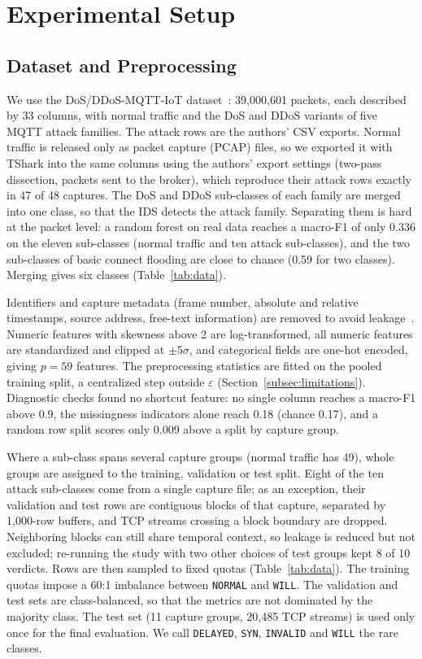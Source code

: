 \section{Experimental Setup}\label{sec:setup}

\subsection{Dataset and Preprocessing}\label{subsec:dataset}
We use the DoS/DDoS-MQTT-IoT dataset~\cite{alatram2023}: 39,000,601 packets, each described by 33 columns, with normal traffic and the DoS and DDoS variants of five MQTT attack families. The attack rows are the authors' CSV exports. Normal traffic is released only as packet capture (PCAP) files, so we exported it with TShark into the same columns using the authors' export settings (two-pass dissection, packets sent to the broker), which reproduce their attack rows exactly in 47 of 48 captures. The DoS and DDoS sub-classes of each family are merged into one class, so that the IDS detects the attack family. Separating them is hard at the packet level: a random forest on real data reaches a macro-F1 of only 0.336 on the eleven sub-classes (normal traffic and ten attack sub-classes), and the two sub-classes of basic connect flooding are close to chance (0.59 for two classes). Merging gives six classes (Table~\ref{tab:data}).

Identifiers and capture metadata (frame number, absolute and relative timestamps, source address, free-text information) are removed to avoid leakage~\cite{arp2022}. Numeric features with skewness above 2 are log-transformed, all numeric features are standardized and clipped at $\pm 5\sigma$, and categorical fields are one-hot encoded, giving $p = 59$ features. The preprocessing statistics are fitted on the pooled training split, a centralized step outside $\varepsilon$ (Section~\ref{subsec:limitations}). Diagnostic checks found no shortcut feature: no single column reaches a macro-F1 above 0.9, the missingness indicators alone reach 0.18 (chance 0.17), and a random row split scores only 0.009 above a split by capture group.

Where a sub-class spans several capture groups (normal traffic has 49), whole groups are assigned to the training, validation or test split. Eight of the ten attack sub-classes come from a single capture file; as an exception, their validation and test rows are contiguous blocks of that capture, separated by 1,000-row buffers, and TCP streams crossing a block boundary are dropped. Neighboring blocks can still share temporal context, so leakage is reduced but not excluded; re-running the study with two other choices of test groups kept 8 of 10 verdicts. Rows are then sampled to fixed quotas (Table~\ref{tab:data}). The training quotas impose a 60:1 imbalance between \texttt{NORMAL} and \texttt{WILL}. The validation and test sets are class-balanced, so that the metrics are not dominated by the majority class. The test set (11 capture groups, 20,485 TCP streams) is used only once for the final evaluation. We call \texttt{DELAYED}, \texttt{SYN}, \texttt{INVALID} and \texttt{WILL} the rare classes.

